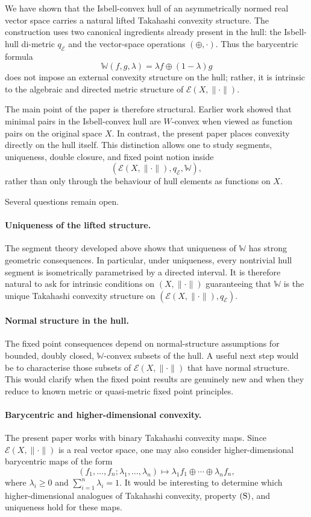 \documentclass[preprint,12pt]{elsarticle}
\numberwithin{equation}{section}
\newcommand{\E}{\mathcal{E}}
\begin{document}
We have shown that the Isbell-convex hull of an asymmetrically normed real
vector space carries a natural lifted Takahashi convexity structure.  The
construction uses two canonical ingredients already present in the hull: the
Isbell-hull di-metric \(q_{\E}\) and the vector-space operations
\((\oplus,\cdot)\).  Thus the barycentric formula
\[
\mathbb W(f,g,\lambda)=\lambda f\oplus(1-\lambda)g
\]
does not impose an external convexity structure on the hull; rather, it is
intrinsic to the algebraic and directed metric structure of
\(\E(X,\|\cdot\|)\).

The main point of the paper is therefore structural.  Earlier work showed that
minimal pairs in the Isbell-convex hull are \(W\)-convex when viewed as
function pairs on the original space \(X\).  In contrast, the present paper
places convexity directly on the hull itself.  This distinction allows one to
study segments, uniqueness, double closure, and fixed point notion inside
\[
(\E(X,\|\cdot\|),q_{\E},\mathbb W),
\]
rather than only through the behaviour of hull elements as functions on \(X\).

Several questions remain open.

\paragraph{Uniqueness of the lifted structure.}
The segment theory developed above shows that uniqueness of \(\mathbb W\) has
strong geometric consequences.  In particular, under uniqueness, every
nontrivial hull segment is isometrically parametrised by a directed interval.
It is therefore natural to ask for intrinsic conditions on
\((X,\|\cdot\|)\) guaranteeing that \(\mathbb W\) is the unique Takahashi
convexity structure on \((\E(X,\|\cdot\|),q_{\E})\).

\paragraph{Normal structure in the hull.}
The fixed point consequences depend on normal-structure assumptions for
bounded, doubly closed, \(\mathbb W\)-convex subsets of the hull.  A useful
next step would be to characterise those subsets of
\(\E(X,\|\cdot\|)\) that have normal structure.  This would clarify when the
fixed point results are genuinely new and when they reduce to known metric or
quasi-metric fixed point principles.

\paragraph{Barycentric and higher-dimensional convexity.}
The present paper works with binary Takahashi convexity maps.  Since
\(\E(X,\|\cdot\|)\) is a real vector space, one may also consider
higher-dimensional barycentric maps of the form
\[
(f_1,\ldots,f_n;\lambda_1,\ldots,\lambda_n)
\longmapsto
\lambda_1 f_1\oplus\cdots\oplus \lambda_n f_n,
\]
where \(\lambda_i\ge0\) and \(\sum_{i=1}^{n}\lambda_i=1\).  It would be
interesting to determine which higher-dimensional analogues of Takahashi
convexity, property \({\rm(S)}\), and uniqueness hold for these maps.
\end{document}
